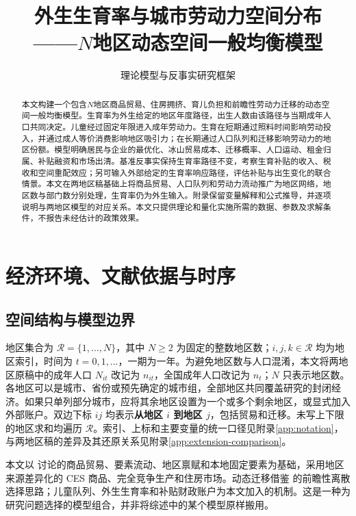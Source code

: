\documentclass[UTF8,a4paper,zihao=-4,fontset=windows]{ctexart}
\title{外生生育率与城市劳动力空间分布\\
  ——$N$地区动态空间一般均衡模型}
\author{理论模型与反事实研究框架}
\date{}
\numberwithin{equation}{section}
\begin{document}
\maketitle

\begin{abstract}
本文构建一个包含$N$地区商品贸易、住房拥挤、育儿负担和前瞻性劳动力迁移的动态空间一般均衡模型。生育率为外生给定的地区年度路径，出生人数由该路径与当期成年人口共同决定。儿童经过固定年限进入成年劳动力。生育在短期通过照料时间影响劳动投入，并通过成人等价消费影响地区吸引力；在长期通过人口队列和迁移影响劳动力的地区份额。模型明确居民与企业的最优化、冰山贸易成本、迁移概率、人口运动、租金归属、补贴融资和市场出清。基准反事实保持生育率路径不变，考察生育补贴的收入、税收和空间重配效应；另可输入外部给定的生育率响应路径，评估补贴与出生变化的联合情景。本文在两地区稿基础上将商品贸易、人口队列和劳动力流动推广为地区网络，地区数与部门数分别处理，生育率仍为外生输入。附录保留变量解释和公式推导，并逐项说明与两地区模型的对应关系。本文只提供理论和量化实施所需的数据、参数及求解条件，不报告未经估计的政策效果。
\end{abstract}
\tableofcontents
\newpage

\section{经济环境、文献依据与时序}
\label{sec:environment}

\subsection{空间结构与模型边界}
地区集合为 $\mathcal R=\{1,\ldots,N\}$，其中 $N\geq2$ 为固定的整数地区数；$i,j,k\in\mathcal R$ 均为地区索引，时间为 $t=0,1,\ldots$，一期为一年。为避免地区数与人口混淆，本文将两地区原稿中的成年人口 $N_{it}$ 改记为 $n_{it}$，全国成年人口改记为 $n_t$；$N$ 只表示地区数。各地区可以是城市、省份或预先确定的城市组，全部地区共同覆盖研究的封闭经济。如果只单列部分城市，应将其余地区设置为一个或多个剩余地区，或显式加入外部账户。双边下标 $ij$ 均表示\textbf{从地区 $i$ 到地区 $j$}，包括贸易和迁移。未写上下限的地区求和均遍历 $\mathcal R$。索引、上标和主要变量的统一口径见附录\ref{app:notation}，与两地区稿的差异及其还原关系见附录\ref{app:extension-comparison}。

本文以 \citet{redding2017quantitative} 讨论的商品贸易、要素流动、地区禀赋和本地固定要素为基础，采用地区来源差异化的 CES 商品、完全竞争生产和住房市场。动态迁移借鉴 \citet{kleinman2023dynamic} 的前瞻性离散选择思路；儿童队列、外生生育率和补贴财政账户为本文加入的机制。这是一种为研究问题选择的模型组合，并非将综述中的某个模型原样搬用。
\end{document}
